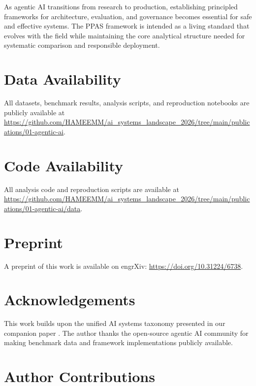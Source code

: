 \documentclass[review,authoryear]{elsarticle}
\theoremstyle{definition}
\begin{document}
As agentic AI transitions from research to production, establishing principled frameworks for architecture, evaluation, and governance becomes essential for safe and effective systems. The PPAS framework is intended as a living standard that evolves with the field while maintaining the core analytical structure needed for systematic comparison and responsible deployment.


\section*{Data Availability}

All datasets, benchmark results, analysis scripts, and reproduction notebooks are publicly available at \url{https://github.com/HAMEEMM/ai_systems_landscape_2026/tree/main/publications/01-agentic-ai}.

\section*{Code Availability}

All analysis code and reproduction scripts are available at \url{https://github.com/HAMEEMM/ai_systems_landscape_2026/tree/main/publications/01-agentic-ai/data}.

\section*{Preprint}

A preprint of this work is available on engrXiv: \url{https://doi.org/10.31224/6738}.

\section*{Acknowledgements}

This work builds upon the unified AI systems taxonomy presented in our companion paper \citep{mahdi2026taxonomy}. The author thanks the open-source agentic AI community for making benchmark data and framework implementations publicly available.

\section*{Author Contributions}
\end{document}
